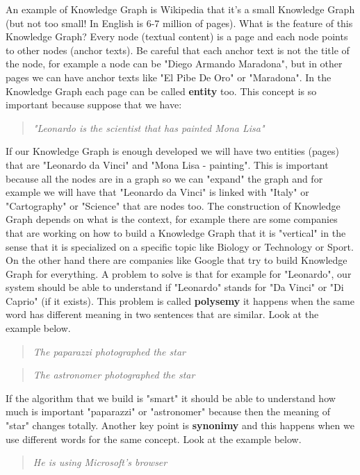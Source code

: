 An example of Knowledge Graph is Wikipedia that it's a small Knowledge Graph (but not too small! In English is 6-7 million of pages). 
What is the feature of this Knowledge Graph? Every node (textual content) is a page and each node points to other nodes (anchor texts). Be careful that each anchor text is not the title of the node, for example a node can be "Diego Armando Maradona", but in other pages we can have anchor texts like "El Pibe De Oro" or "Maradona".
In the Knowledge Graph each page can be called \textbf{entity} too.
This concept is so important because suppose that we have:
\begin{quote}

\centering \textit{"Leonardo is the scientist that has painted Mona Lisa"}
\end{quote}
If our Knowledge Graph is enough developed we will have two entities (pages) that are "Leonardo da Vinci" and "Mona Lisa - painting".
This is important because all the nodes are in a graph so we can "expand" the graph and for example we will have that "Leonardo da Vinci" is linked with "Italy" or "Cartography" or "Science" that are nodes too.
The construction of Knowledge Graph depends on what is the context, for example there are some companies that are working on how to build a Knowledge Graph that it is "vertical" in the sense that it is specialized on a specific topic like Biology or Technology or Sport. On the other hand there are companies like Google that try to build Knowledge Graph for everything.
A problem to solve is that for example for "Leonardo", our system should be able to understand if "Leonardo" stands for "Da Vinci" or "Di Caprio" (if it exists).
This problem is called \textbf{polysemy} it happens when the same word has different meaning in two sentences that are similar. Look at the example below.
\begin{quote}
    \centering \textit{The paparazzi photographed the star}
\end{quote}
\begin{quote}
    \centering \textit{The astronomer photographed the star}
\end{quote}
If the algorithm that we build is "smart" it should be able to understand how much is important "paparazzi" or "astronomer" because then the meaning of "star" changes totally.
Another key point is \textbf{synonimy} and this happens when we use different words for the same concept. Look at the example below.
\begin{quote}
    \centering \textit{He is using Microsoft's browser}
\end{quote}
